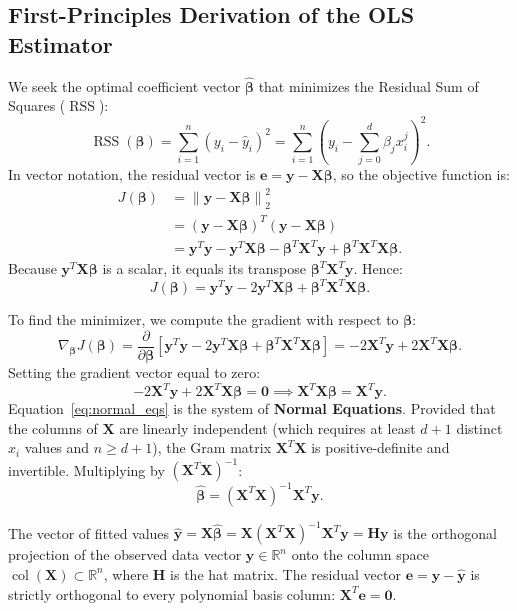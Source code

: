 \documentclass[11pt,a4paper]{article}
\numberwithin{equation}{section}
\newcommand{\RR}{\mathbb{R}}
\newcommand{\RSS}{\operatorname{RSS}}
\newcommand{\norm}[1]{\left\lVert #1\right\rVert}
\newcommand{\X}{\mathbf{X}}
\newcommand{\y}{\mathbf{y}}
\newcommand{\bta}{\boldsymbol{\beta}}
\newcommand{\bhat}{\widehat{\boldsymbol{\beta}}}
\begin{document}
\subsection{First-Principles Derivation of the OLS Estimator}
We seek the optimal coefficient vector $\bhat$ that minimizes the Residual Sum of Squares ($\RSS$):
\begin{equation}
  \RSS(\bta) = \sum_{i=1}^n \left( y_i - \hat{y}_i \right)^2 = \sum_{i=1}^n \left( y_i - \sum_{j=0}^d \beta_j x_i^j \right)^2.
\end{equation}
In vector notation, the residual vector is $\mathbf{e} = \y - \X\bta$, so the objective function is:
\begin{align}
  J(\bta) &= \norm{\y - \X\bta}_2^2 \nonumber \\
          &= (\y - \X\bta)^T (\y - \X\bta) \nonumber \\
          &= \y^T\y - \y^T\X\bta - \bta^T\X^T\y + \bta^T\X^T\X\bta.
\end{align}
Because $\y^T\X\bta$ is a scalar, it equals its transpose $\bta^T\X^T\y$. Hence:
\begin{equation}
  J(\bta) = \y^T\y - 2\y^T\X\bta + \bta^T\X^T\X\bta.
  \label{eq:expanded_loss}
\end{equation}

To find the minimizer, we compute the gradient with respect to $\bta$:
\begin{equation}
  \nabla_{\bta} J(\bta) = \frac{\partial}{\partial \bta} \left[ \y^T\y - 2\y^T\X\bta + \bta^T\X^T\X\bta \right] = -2\X^T\y + 2\X^T\X\bta.
\end{equation}
Setting the gradient vector equal to zero:
\begin{equation}
  -2\X^T\y + 2\X^T\X\bta = \mathbf{0} \implies \boxed{\X^T\X\bta = \X^T\y.}
  \label{eq:normal_eqs}
\end{equation}
Equation~\eqref{eq:normal_eqs} is the system of \textbf{Normal Equations}. Provided that the columns of $\X$ are linearly independent (which requires at least $d+1$ distinct $x_i$ values and $n \geq d+1$), the Gram matrix $\X^T\X$ is positive-definite and invertible. Multiplying by $(\X^T\X)^{-1}$:
\begin{equation}
  \boxed{\bhat = (\X^T\X)^{-1}\X^T\y.}
  \label{eq:ols_solution}
\end{equation}

\begin{intuition}[title=Geometric Projection in Polynomial Space]
The vector of fitted values $\hat{\y} = \X\bhat = \X(\X^T\X)^{-1}\X^T\y = \mathbf{H}\y$ is the orthogonal projection of the observed data vector $\y \in \RR^n$ onto the column space $\operatorname{col}(\X) \subset \RR^n$, where $\mathbf{H}$ is the hat matrix. The residual vector $\mathbf{e} = \y - \hat{\y}$ is strictly orthogonal to every polynomial basis column: $\X^T \mathbf{e} = \mathbf{0}$.
\end{intuition}
\end{document}
